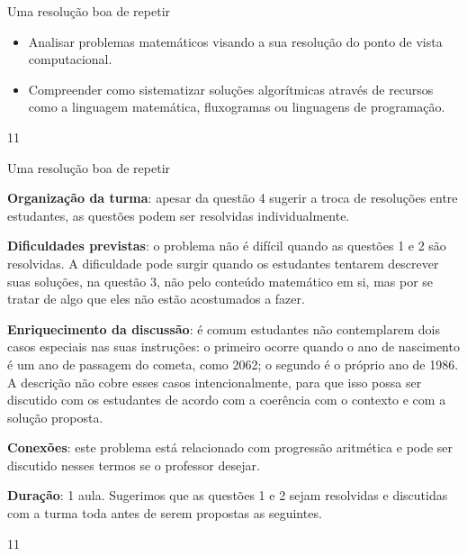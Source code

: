 \clearmargin
\begin{objectives}{Uma resolução boa de repetir}
{
\begin{itemize}
\item Analisar problemas matemáticos visando a sua resolução do ponto de vista computacional.

\item Compreender como sistematizar soluções algorítmicas através de recursos como a linguagem matemática, fluxogramas ou linguagens de programação.
\end{itemize}
}{1}{1}
\end{objectives}
\begin{sugestions}{Uma resolução boa de repetir}
{
\textbf{Organização da turma}: apesar da questão 4 sugerir a troca de resoluções entre estudantes, as questões podem ser resolvidas individualmente.

\textbf{Dificuldades previstas}: o problema não é difícil quando as questões 1 e 2 são resolvidas. A dificuldade pode surgir quando os estudantes tentarem descrever suas soluções, na questão 3, não pelo conteúdo matemático em si, mas por se tratar de algo que eles não estão acostumados a fazer.

\textbf{Enriquecimento da discussão}: é comum estudantes não contemplarem dois casos especiais nas suas instruções: o primeiro ocorre quando o ano de nascimento é um ano de passagem do cometa, como 2062; o segundo é o próprio ano de 1986. A descrição não cobre esses casos intencionalmente, para que isso possa ser discutido com os estudantes de acordo com a coerência com o contexto e com a solução proposta.

\textbf{Conexões}: este problema está relacionado com progressão aritmética e pode ser discutido nesses termos se o professor desejar.

\textbf{Duração}: 1 aula. Sugerimos que as questões 1 e 2 sejam resolvidas e discutidas com a turma toda antes de serem propostas as seguintes.
}{1}{1}
\end{sugestions}
